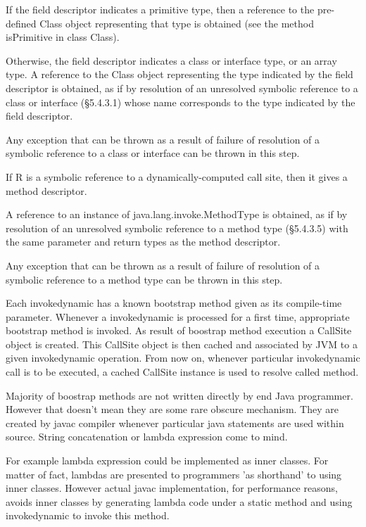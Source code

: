     If the field descriptor indicates a primitive type, then a reference to the pre-defined Class object representing that type is obtained (see the method isPrimitive in class Class).

    Otherwise, the field descriptor indicates a class or interface type, or an array type. A reference to the Class object representing the type indicated by the field descriptor is obtained, as if by resolution of an unresolved symbolic reference to a class or interface (§5.4.3.1) whose name corresponds to the type indicated by the field descriptor.

    Any exception that can be thrown as a result of failure of resolution of a symbolic reference to a class or interface can be thrown in this step.

    If R is a symbolic reference to a dynamically-computed call site, then it gives a method descriptor.

    A reference to an instance of java.lang.invoke.MethodType is obtained, as if by resolution of an unresolved symbolic reference to a method type (§5.4.3.5) with the same parameter and return types as the method descriptor.

    Any exception that can be thrown as a result of failure of resolution of a symbolic reference to a method type can be thrown in this step.


Each invokedynamic has a known bootstrap method given as its compile-time parameter. Whenever a invokedynamic is processed for a first time, appropriate bootstrap method is invoked. As result of boostrap method execution a CallSite object is created. This CallSite object is then cached and associated by JVM to a given invokedynamic operation. From now on, whenever particular invokedynamic call is to be executed, a cached CallSite instance is used to resolve called method.

Majority of boostrap methods are not written directly by end Java programmer. However that doesn't mean they are some rare obscure mechanism. They are created by javac compiler whenever particular java statements are used within source. String concatenation or lambda expression come to mind.

For example lambda expression could be implemented as inner classes. For matter of fact, lambdas are presented to programmers 'as shorthand' to using inner classes. However actual javac implementation, for performance reasons, avoids inner classes by generating lambda code under a static method and using invokedynamic to invoke this method.


